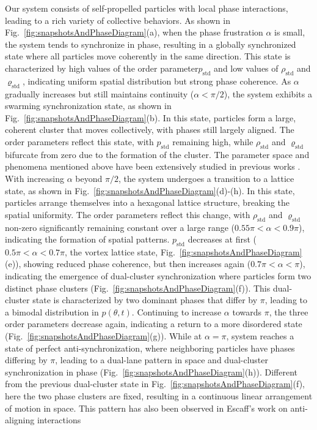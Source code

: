 \documentclass{article}
\begin{document}
Our system consists of self-propelled particles with local phase interactions, leading to a rich variety of collective behaviors. As shown in Fig.~\ref{fig:snapshotsAndPhaseDiagram}(a), when the phase frustration $\alpha$ is small, the system tends to synchronize in phase, resulting in a globally synchronized state where all particles move coherently in the same direction. This state is characterized by high values of the order parameter$p_{\mathrm{std}}$ and low values of $\rho_{\mathrm{std}}$ and $\varrho_{\mathrm{std}}$, indicating uniform spatial distribution but strong phase coherence. As $\alpha$ gradually increases but still maintains continuity ($\alpha < \pi/2$), the system exhibits a swarming synchronization state, as shown in Fig.~\ref{fig:snapshotsAndPhaseDiagram}(b). In this state, particles form a large, coherent cluster that moves collectively, with phases still largely aligned. The order parameters reflect this state, with $p_{\mathrm{std}}$ remaining high, while $\rho_{\mathrm{std}}$ and $\varrho_{\mathrm{std}}$ bifurcate from zero due to the formation of the cluster. The parameter space and phenomena mentioned above have been extensively studied in previous works \cite{PhysRevE.98.032219,PhysRevE.102.022604}.
With increasing $\alpha$ beyond $\pi/2$, the system undergoes a transition to a lattice state, as shown in Fig.~\ref{fig:snapshotsAndPhaseDiagram}(d)-(h). In this state, particles arrange themselves into a hexagonal lattice structure, breaking the spatial uniformity. The order parameters reflect this change, with $\rho_{\mathrm{std}}$ and $\varrho_{\mathrm{std}}$ non-zero significantly remaining constant over a large range ($0.55\pi<\alpha<0.9\pi$), indicating the formation of spatial patterns. $p_{\mathrm{std}}$ decreases at first ($0.5\pi<\alpha<0.7\pi$, the vortex lattice state, Fig.~\ref{fig:snapshotsAndPhaseDiagram}(e)), showing reduced phase coherence, but then increases again ($0.7\pi<\alpha<\pi$), indicating the emergence of dual-cluster synchronization where particles form two distinct phase clusters (Fig.~\ref{fig:snapshotsAndPhaseDiagram}(f)). This dual-cluster state is characterized by two dominant phases that differ by $\pi$, leading to a bimodal distribution in $p(\theta, t)$. 
Continuing to increase $\alpha$ towards $\pi$, the three order parameters decrease again, indicating a return to a more disordered state (Fig.~\ref{fig:snapshotsAndPhaseDiagram}(g)).
While at $\alpha = \pi$, system reaches a state of perfect anti-synchronization, where neighboring particles have phases differing by $\pi$, leading to a dual-lane pattern in space and dual-cluster synchronization in phase (Fig.~\ref{fig:snapshotsAndPhaseDiagram}(h)). Different from the previous dual-cluster state in Fig.~\ref{fig:snapshotsAndPhaseDiagram}(f), here the two phase clusters are fixed, resulting in a continuous linear arrangement of motion in space. This pattern has also been observed in Escaff's work on anti-aligning interactions \cite{PhysRevE.109.024602,PhysRevE.110.024603}
\end{document}
